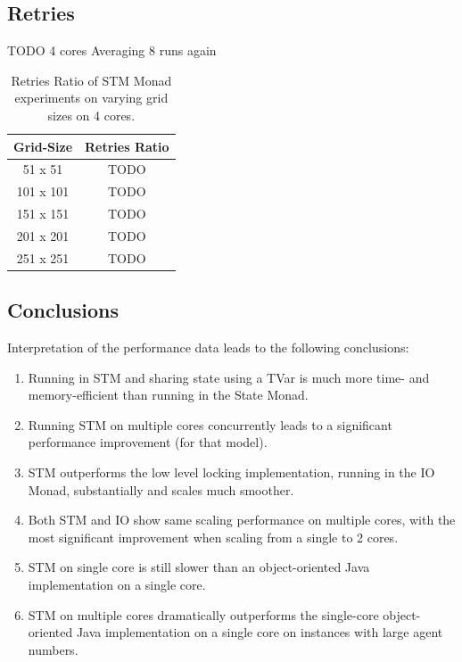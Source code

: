 
\subsection{Retries}
TODO
4 cores
Averaging 8 runs again

\begin{table}
	\centering
  	\begin{tabular}{ c || c  }
        Grid-Size & Retries Ratio \\ \hline \hline 
   		51 x 51   & TODO \\ \hline
   		101 x 101 & TODO \\ \hline
   		151 x 151 & TODO \\ \hline
   		201 x 201 & TODO \\ \hline 
   		251 x 251 & TODO \\ \hline
  	\end{tabular}
  	
  	\caption{Retries Ratio of STM Monad experiments on varying grid sizes on 4 cores.}
	\label{tab:retries_stm}
\end{table}


\subsection{Conclusions}
Interpretation of the performance data leads to the following conclusions:
\begin{enumerate}
	\item Running in STM and sharing state using a TVar is much more time- and memory-efficient than running in the State Monad.
	\item Running STM on multiple cores concurrently leads to a significant performance improvement (for that model).
	\item STM outperforms the low level locking implementation, running in the IO Monad, substantially and scales much smoother.
	\item Both STM and IO show same scaling performance on multiple cores, with the most significant improvement when scaling from a single to 2 cores.
	\item STM on single core is still slower than an object-oriented Java implementation on a single core.
	\item STM on multiple cores dramatically outperforms the single-core object-oriented Java implementation on a single core on instances with large agent numbers.
\end{enumerate}